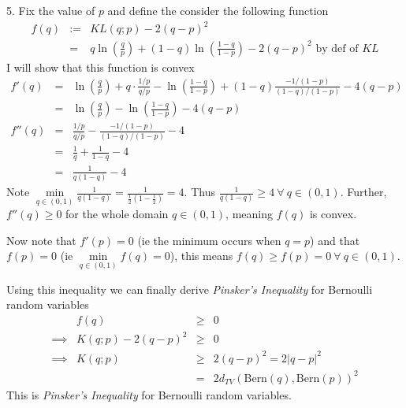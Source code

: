 \documentclass[11pt,a4paper]{article}
\begin{document}
\begin{answer}{5.}
  Fix the value of $p$ and define the consider the following function
  \[\begin{array}{rrl}
    f(q)&:=&KL(q;p)-2(q-p)^2\\
    &=&q\ln\left(\frac{q}p\right)+(1-q)\ln\left(\frac{1-q}{1-p}\right)-2(q-p)^2\text{ by def of }KL
  \end{array}\]
  I will show that this function is convex
  \[\begin{array}{rcl}
    f'(q)&=&\ln\left(\frac{q}p\right)+q\cdot\frac{1/p}{q/p}-\ln\left(\frac{1-q}{1-p}\right)+(1-q)\frac{-1/(1-p)}{(1-q)/(1-p)}-4(q-p)\\
    &=&\ln\left(\frac{q}p\right)-\ln\left(\frac{1-q}{1-p}\right)-4(q-p)\\
    f''(q)&=&\frac{1/p}{q/p}-\frac{-1/(1-p)}{(1-q)/(1-p)}-4\\
    &=&\frac1q+\frac1{1-q}-4\\
    &=&\frac1{q(1-q)}-4
  \end{array}\]
  Note $\underset{q\in(0,1)}\min\frac1{q(1-q)}=\frac1{\frac12(1-\frac12)}=4$. Thus $\frac1{q(1-q)}\geq 4\ \forall\ q\in(0,1)$.
  Further, $f''(q)\geq0$ for the whole domain $q\in(0,1)$, meaning $f(q)$ is convex.
  \par Now note that $f'(p)=0$ (ie the minimum occurs when $q=p$) and that $f(p)=0$ (ie $\underset{q\in(0,1)}\min f(q)=0$), this means $f(q)\geq f(p)=0\ \forall\ q\in(0,1)$.
  \par Using this inequality we can finally derive \textit{Pinsker's Inequality} for Bernoulli random variables
  \[\begin{array}{rrcl}
    &f(q)&\geq&0\\
    \implies&K(q;p)-2(q-p)^2&\geq&0\\
    \implies&K(q;p)&\geq&2(q-p)^2=2|q-p|^2\\
    &&=&2d_{TV}(\text{Bern}(q),\text{Bern}(p))^2
  \end{array}\]
  This is \textit{Pinsker's Inequality} for Bernoulli random variables.
\end{answer}
\end{document}
